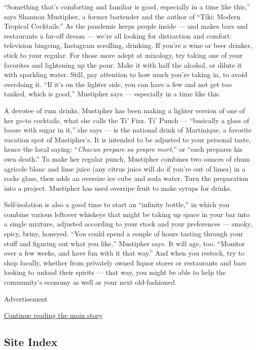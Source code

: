 ``Something that's comforting and familiar is good, especially in a time
like this,'' says Shannon Mustipher, a former bartender and the author
of ``Tiki: Modern Tropical Cocktails.'' As the pandemic keeps people
inside --- and makes bars and restaurants a far-off dream --- we're all
looking for distraction and comfort: television bingeing, Instagram
scrolling, drinking. If you're a wine or beer drinker, stick to your
regular. For those more adept at mixology, try taking one of your
favorites and lightening up the pour: Make it with half the alcohol, or
dilute it with sparkling water. Still, pay attention to how much you're
taking in, to avoid overdoing it. ``If it's on the lighter side, you can
have a few and not get too tanked, which is good,'' Mustipher says ---
especially in a time like this.

A devotee of rum drinks, Mustipher has been making a lighter version of
one of her go-to cocktails, what she calls the Ti' Fizz. Ti' Punch ---
``basically a glass of booze with sugar in it,'' she says --- is the
national drink of Martinique, a favorite vacation spot of Mustipher's.
It is intended to be adjusted to your personal taste, hence the local
saying: ``\emph{Chacun prepare sa propre mort},'' or ``each prepares his
own death.'' To make her regular punch, Mustipher combines two ounces of
rhum agricole blanc and lime juice (any citrus juice will do if you're
out of limes) in a rocks glass, then adds an oversize ice cube and soda
water. Turn the preparation into a project. Mustipher has used overripe
fruit to make syrups for drinks.

Self-isolation is also a good time to start an ``infinity bottle,'' in
which you combine various leftover whiskeys that might be taking up
space in your bar into a single mixture, adjusted according to your
stock and your preferences --- smoky, spicy, briny, honeyed. ``You could
spend a couple of hours tasting through your stuff and figuring out what
you like,'' Mustipher says. It will age, too. ``Monitor over a few
weeks, and have fun with it that way.'' And when you restock, try to
shop locally, whether from privately owned liquor stores or restaurants
and bars looking to unload their spirits --- that way, you might be able
to help the community's economy as well as your next old-fashioned.

Advertisement

\protect\hyperlink{after-bottom}{Continue reading the main story}

\hypertarget{site-index}{%
\subsection{Site Index}\label{site-index}}

